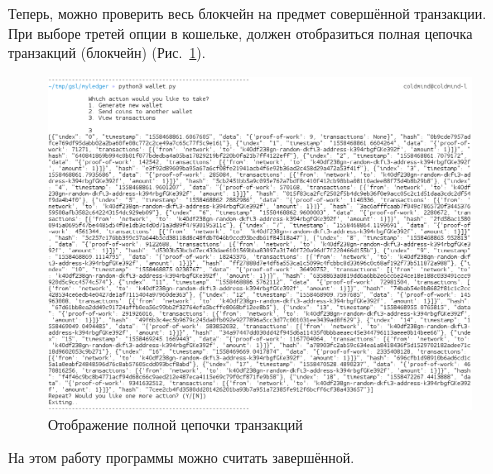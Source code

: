 Теперь, можно проверить весь блокчейн на предмет совершённой транзакции. При
выборе третей опции в кошельке, должен отобразиться полная цепочка
транзакций (блокчейн) (Рис.~\ref{full_chain}).
\begin{figure}[h!]
    \centering
    \includegraphics[width=\textwidth]{./screenshots/full_chain}
    \caption{Отображение полной цепочки транзакций}\label{full_chain}
\end{figure}

На этом работу программы можно считать завершённой.
\newpage
